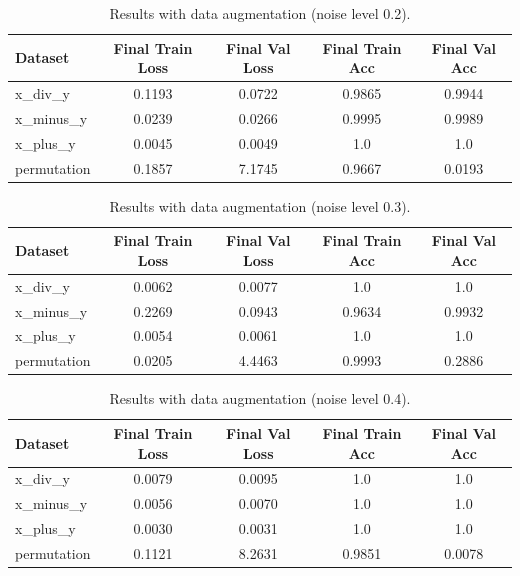 \documentclass{article} %
\begin{document}
\begin{table}[h]
    \centering
    \begin{tabular}{lcccc}
        \toprule
        Dataset & Final Train Loss & Final Val Loss & Final Train Acc & Final Val Acc \\
        \midrule
        x\_div\_y & 0.1193 & 0.0722 & 0.9865 & 0.9944 \\
        x\_minus\_y & 0.0239 & 0.0266 & 0.9995 & 0.9989 \\
        x\_plus\_y & 0.0045 & 0.0049 & 1.0 & 1.0 \\
        permutation & 0.1857 & 7.1745 & 0.9667 & 0.0193 \\
        \bottomrule
    \end{tabular}
    \caption{Results with data augmentation (noise level 0.2).}
    \label{tab:results_noise_0.2}
\end{table}

\begin{table}[h]
    \centering
    \begin{tabular}{lcccc}
        \toprule
        Dataset & Final Train Loss & Final Val Loss & Final Train Acc & Final Val Acc \\
        \midrule
        x\_div\_y & 0.0062 & 0.0077 & 1.0 & 1.0 \\
        x\_minus\_y & 0.2269 & 0.0943 & 0.9634 & 0.9932 \\
        x\_plus\_y & 0.0054 & 0.0061 & 1.0 & 1.0 \\
        permutation & 0.0205 & 4.4463 & 0.9993 & 0.2886 \\
        \bottomrule
    \end{tabular}
    \caption{Results with data augmentation (noise level 0.3).}
    \label{tab:results_noise_0.3}
\end{table}

\begin{table}[h]
    \centering
    \begin{tabular}{lcccc}
        \toprule
        Dataset & Final Train Loss & Final Val Loss & Final Train Acc & Final Val Acc \\
        \midrule
        x\_div\_y & 0.0079 & 0.0095 & 1.0 & 1.0 \\
        x\_minus\_y & 0.0056 & 0.0070 & 1.0 & 1.0 \\
        x\_plus\_y & 0.0030 & 0.0031 & 1.0 & 1.0 \\
        permutation & 0.1121 & 8.2631 & 0.9851 & 0.0078 \\
        \bottomrule
    \end{tabular}
    \caption{Results with data augmentation (noise level 0.4).}
    \label{tab:results_noise_0.4}
\end{table}
\end{document}
